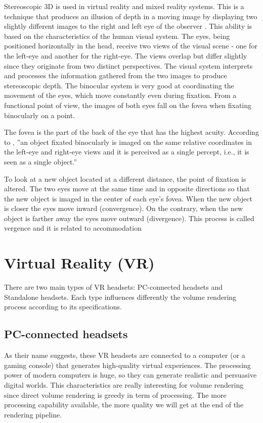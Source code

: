 Stereoscopic 3D is used in virtual reality and  mixed reality systems.
This  is a technique that produces an illusion of depth in a moving image by displaying two slightly different images to the right and left eye of the observer . This ability is based on the characteristics of the human visual system. The eyes, being positioned horizontally in the head, receive two views of the visual scene - one for the left-eye and another for the right-eye. The views overlap but differ slightly since they originate from two distinct perspectives. The visual system interprets and processes the information gathered from the two images to produce stereoscopic depth. The binocular system is very good at coordinating the movement of the eyes, which move constantly even during fixation. From a functional point of view, the images of both eyes fall on the fovea when fixating binocularly on a point. 


The fovea is the part of the back of the eye that has the highest acuity. According to \cite{5743036}, ''an object fixated binocularly is imaged on the same relative coordinates in the left-eye and right-eye views and it is perceived as a single percept, i.e., it is seen as a single object.''



To look at a new object located at a different distance, the point of fixation is altered. The two eyes move at the same time and in opposite directions so that the new object is imaged in the center of each eye's fovea. When the new object is closer the eyes move inward (convergence). On the contrary, when the new object is farther away the eyes move outward (divergence). This process is called vergence and it is related to accommodation

\section{ Virtual Reality (VR)}

There are two main types of VR headsets: PC-connected headsets and Standalone headsets. Each type influences differently the volume rendering process according to its specifications.


\subsection{PC-connected headsets}

As their name suggests, these VR headsets are connected to a computer (or a gaming console) that generates high-quality virtual experiences. The processing power of modern computers is huge, so they can generate realistic and persuasive digital worlds. This characteristics are really interesting for volume rendering since direct volume rendering is greedy in term of processing. The more processing capability available, the more quality we will get at the end of the rendering pipeline. 

